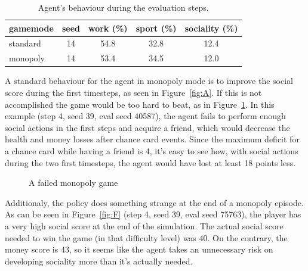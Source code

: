\documentclass{article}
\begin{document}
\begin{table}
  \caption{Agent's behaviour during the evaluation steps.}
  \label{behaviour}
  \centering
  \begin{tabular}{lcccc}
    \toprule
    gamemode & seed & work (\%) & sport (\%) & sociality (\%) \\
    \midrule
    standard & 14 & 54.8  & 32.8    & 12.4  \\
    monopoly & 14 & 53.4  & 34.5    & 12.0  \\
    \bottomrule
  \end{tabular}
\end{table}

A standard behaviour for the agent in monopoly mode is to improve the social score during the first timesteps, as seen in Figure~\ref{fig:A}. If this is not accomplished the game would be too hard to beat, as in Figure~\ref{fig:E}. In this example (step 4, seed 39, eval seed 40587), the agent fails to perform enough social actions in the first steps and acquire a friend, which would decrease the health and money losses after chance card events. Since the maximum deficit for a chance card while having a friend is 4, it's easy to see how, with social actions during the two first timesteps, the agent would have lost at least 18 points less. 

\begin{figure}
  \centering
  \caption{A failed monopoly game}
  \label{fig:E}
\end{figure} 

Additionaly, the policy does something strange at the end of a monopoly episode. As can be seen in Figure~\ref{fig:F} (step 4, seed 39, eval seed 75763), the player has a very high social score at the end of the simulation. The actual social score needed to win the game (in that difficulty level) was 40. On the contrary, the money score is 43, so it seems like the agent takes an unnecessary risk on developing sociality more than it's actually needed.
\end{document}
